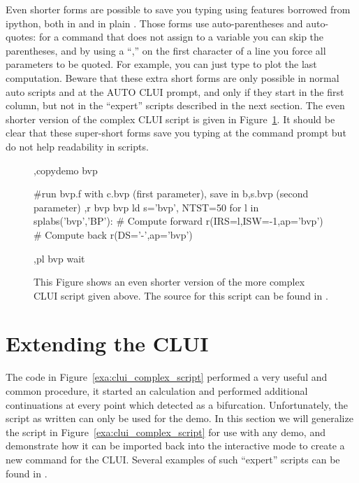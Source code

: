 \documentclass[12pt]{report}
\begin{document}
 Even shorter forms are possible to save you typing using features
 borrowed from ipython, both in  and in plain
 . Those forms use auto-parentheses and auto-quotes:
 for a command that does not assign to a variable you can skip the
 parentheses, and by using a ``,'' on the first character of a line
 you force all parameters to be quoted. For example, you can just
 type  to plot the last computation.
 Beware that these extra short forms are only possible in
 normal auto scripts and at the AUTO CLUI prompt, and only if they
 start in the first column, but not in the
 ``expert'' scripts described in the next section.
 The even shorter version of the complex \AUTO
 CLUI script is given in Figure~\ref{exa:clui_complex_fifth}.
 It should be clear that these super-short forms save you typing
 at the command prompt but do not help readability in scripts.
 \begin{figure}[htbp]
 {\small \begin{center} \begin{boxedverbatim}
 ,copydemo bvp

 #run bvp.f with c.bvp (first parameter), save in {b,s}.bvp (second parameter)
 ,r bvp bvp
 ld s='bvp', NTST=50
 for l in splabs('bvp','BP'):
     # Compute forward
     r(IRS=l,ISW=-1,ap='bvp')
     # Compute back
     r(DS='-',ap='bvp')

 ,pl bvp
 wait
 \end{boxedverbatim}
 \end{center} 
 }
 \caption[Another complex example of a \AUTO CLUI script.]
 {This Figure shows an even shorter version of the more complex \AUTO CLUI
   script given above.
 The source for this script can be found in .
 }
 \label{exa:clui_complex_fifth}
 \end{figure}



 \section{ Extending the \AUTO CLUI } \label{sec:clui_extending}

 The code in Figure~\ref{exa:clui_complex_script}
 performed a very useful and common procedure, it started an \AUTO
 calculation and performed additional continuations
 at every point which \AUTO detected as a bifurcation.
 Unfortunately, the script as written can only be used
 for the  demo.  In this section we will 
 generalize the script in Figure~\ref{exa:clui_complex_script}
 for use with any demo, and demonstrate how it
 can be imported back into the interactive
 mode to create a new command
 for the \AUTO CLUI.  Several examples of such
 ``expert'' scripts can be found in .
\end{document}
